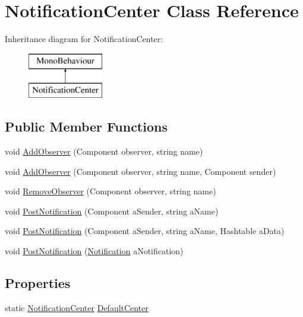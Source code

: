 \hypertarget{class_notification_center}{}\section{Notification\+Center Class Reference}
\label{class_notification_center}
Inheritance diagram for Notification\+Center\+:\begin{figure}[H]
\begin{center}
\leavevmode
\includegraphics[height=2.000000cm]{class_notification_center}
\end{center}
\end{figure}
\subsection*{Public Member Functions}
\begin{DoxyCompactItemize}
\item 
void \hyperlink{class_notification_center_a6c51a989d4913a10a6596b60c04ac81e}{Add\+Observer} (Component observer, string name)
\item 
void \hyperlink{class_notification_center_abe0320311b4dbbfff3c537154136f34b}{Add\+Observer} (Component observer, string name, Component sender)
\item 
void \hyperlink{class_notification_center_a95810c7f4cdbcbb16ec414cf70c24dae}{Remove\+Observer} (Component observer, string name)
\item 
void \hyperlink{class_notification_center_ac98769b91f2596841812e19177c65634}{Post\+Notification} (Component a\+Sender, string a\+Name)
\item 
void \hyperlink{class_notification_center_ade5206fb4becbd921b30bb35c25cc1ed}{Post\+Notification} (Component a\+Sender, string a\+Name, Hashtable a\+Data)
\item 
void \hyperlink{class_notification_center_a6a095e0bdd0dca522b6f2d31d360a806}{Post\+Notification} (\hyperlink{class_notification}{Notification} a\+Notification)
\end{DoxyCompactItemize}
\subsection*{Properties}
\begin{DoxyCompactItemize}
\item 
static \hyperlink{class_notification_center}{Notification\+Center} \hyperlink{class_notification_center_a071abaa07d2de388029551de242d405b}{Default\+Center}
\end{DoxyCompactItemize}


